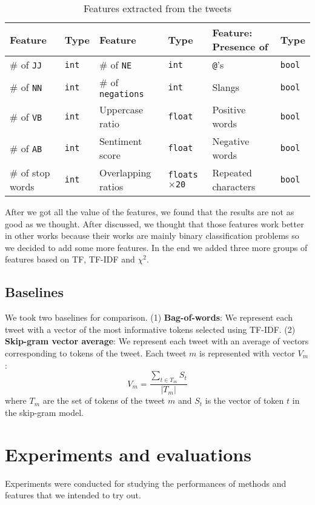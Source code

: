 \documentclass[english, table, latin9]{article}
\begin{document}
\begin{table}[t]
\caption{Features extracted from the tweets}
\label{tb:features}
\centering
\begin{tabularx}{420pt}{ll|ll||ll}
	\toprule
		\textbf{Feature} & \textbf{Type} & \textbf{Feature} & \textbf{Type} & \textbf{Feature}: Presence of & \textbf{Type} \\
	\midrule
		\# of \texttt{JJ} & \texttt{int} & \# of \texttt{NE} & \texttt{int} & \texttt{@}'s & \texttt{bool} \\
		\# of \texttt{NN} & \texttt{int} & \# of \texttt{negations} & \texttt{int} & Slangs & \texttt{bool} \\
		\# of \texttt{VB} & \texttt{int} & Uppercase ratio & \texttt{float} & Positive words & \texttt{bool} \\
		\# of \texttt{AB} & \texttt{int} & Sentiment score & \texttt{float} & Negative words & \texttt{bool} \\
		\# of stop words & \texttt{int} & Overlapping ratios & \texttt{floats$\times$20} & Repeated characters & \texttt{bool} \\
	\bottomrule
\end{tabularx}
\end{table}

After we got all the value of the features, we found that the results are not as good as we thought. After discussed, we thought that those features work better in other works because their works are mainly binary classification problems so we decided to add some more features\cite{bib3}. In the end we added three more groups of features based on TF, TF-IDF and $\chi^2$.

\subsection{Baselines}
\label{sc34}
We took two baselines\cite{bib4} for comparison. (1) \textbf{Bag-of-words}: We represent each tweet with a vector of the most informative tokens selected using TF-IDF. (2) \textbf{Skip-gram vector average}: We represent each tweet with an average of vectors corresponding to tokens of the tweet. Each tweet $m$ is represented with vector $V_m$:
	\[
		V_m=\frac{\sum_{t\in T_m}S_t}{\lvert T_m\rvert}
	\]
where $T_m$ are the set of tokens of the tweet $m$ and $S_t$ is the vector of token $t$ in the skip-gram model.

\section{Experiments and evaluations}
\label{sc4}
Experiments were conducted for studying the performances of methods and features that we intended to try out.
\end{document}
